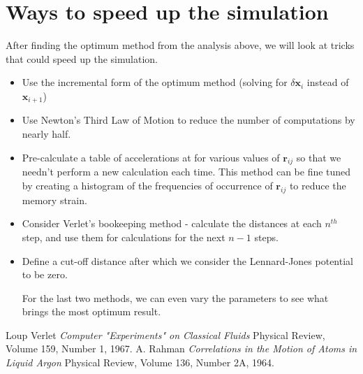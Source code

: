 \documentclass[a4paper, 11pt]{article}
\renewcommand{\vec}[1]{\mathbf{#1}}
\begin{document}
	\section{Ways to speed up the simulation}
	After finding the optimum method from the analysis above, we will look at tricks that could speed up the simulation.
\begin{itemize}
	\item Use the incremental form of the optimum method (solving for $\delta \vec{x}_{i}$ instead of $\vec{x}_{i+1}$)
	\item Use Newton's Third Law of Motion to reduce the number of computations by nearly half.
	\item Pre-calculate a table of accelerations at for various values of $\vec{r}_{ij}$ so that we needn't perform a new calculation each time. This method can be fine tuned by creating a histogram of the frequencies of occurrence of $\vec{r}_{ij}$ to reduce the memory strain.
	\item Consider Verlet's bookeeping method \cite{Verlet1967} - calculate the distances at each $n^{th}$ step, and use them for calculations for the next $n-1$ steps.
	\item Define a cut-off distance after which we consider the Lennard-Jones potential to be zero.

For the last two methods, we can even vary the parameters to see what brings the most optimum result.  
\end{itemize}
\begin{thebibliography}{10}
		{\sc Loup Verlet}
		{\it Computer "Experiments" on Classical Fluids}
		Physical Review, Volume 159, Number 1, 1967.
		{\sc A. Rahman}
		{\it Correlations in the Motion of Atoms in Liquid Argon}
		Physical Review, Volume 136, Number 2A, 1964.
\end{thebibliography}
\end{document}
